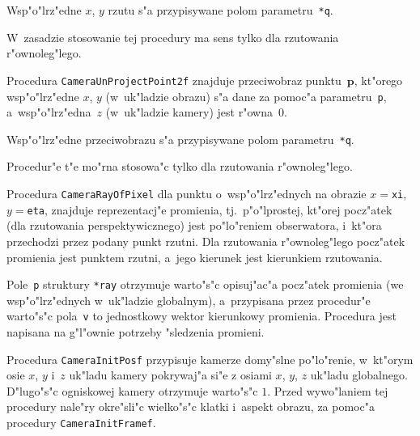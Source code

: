 Wsp"o"lrz"edne $x$, $y$ rzutu s"a przypisywane polom parametru~\texttt{*q}.

W~zasadzie stosowanie tej procedury ma sens tylko dla rzutowania
r"ownoleg"lego.

\newpage
Procedura \texttt{CameraUnProjectPoint2f} znajduje przeciwobraz
punktu~$\bm{p}$, kt"orego wsp"o"lrz"edne $x$, $y$ (w~uk"ladzie obrazu)
s"a dane za pomoc"a parametru~\texttt{p}, a~wsp"o"lrz"edna~$z$
(w~uk"ladzie kamery) jest r"owna~$0$.

Wsp"o"lrz"edne przeciwobrazu s"a przypisywane polom parametru~\texttt{*q}.

Procedur"e t"e mo"rna stosowa"c tylko dla rzutowania r"ownoleg"lego.

\vspace{\bigskipamount}
\begin{sloppypar}
Procedura \texttt{CameraRayOfPixel} dla punktu o~wsp"o"lrz"ednych na obrazie
$x={}$\texttt{xi}, $y={}$\texttt{eta}, znajduje reprezentacj"e promienia,
tj.\ p"o"lprostej, kt"orej pocz"atek (dla rzutowania perspektywicznego)
jest po"lo"reniem obserwatora, i~kt"ora przechodzi przez podany punkt rzutni.
Dla rzutowania r"ownoleg"lego pocz"atek promienia jest punktem rzutni,
a~jego kierunek jest kierunkiem rzutowania.%
\end{sloppypar}

\begin{sloppypar}
Pole~\texttt{p} struktury \texttt{*ray} otrzymuje warto"s"c opisuj"ac"a
pocz"atek promienia (we wsp"o"lrz"ednych w~uk"ladzie globalnym),
a~przypisana przez procedur"e warto"s"c pola~\texttt{v} to jednostkowy
wektor kierunkowy promienia. Procedura jest napisana na g"l"ownie potrzeby
"sledzenia promieni.%
\end{sloppypar}

\vspace{\bigskipamount}
Procedura \texttt{CameraInitPosf} przypisuje kamerze domy"slne po"lo"renie,
w~kt"orym osie $x$, $y$ i~$z$ uk"ladu kamery pokrywaj"a si"e z osiami $x$,
$y$, $z$ uk"ladu globalnego. D"lugo"s"c ogniskowej kamery otrzymuje
warto"s"c $1$. Przed wywo"laniem tej procedury nale"ry okre"sli"c wielko"s"c
klatki i~aspekt obrazu, za pomoc"a procedury \texttt{CameraInitFramef}.

